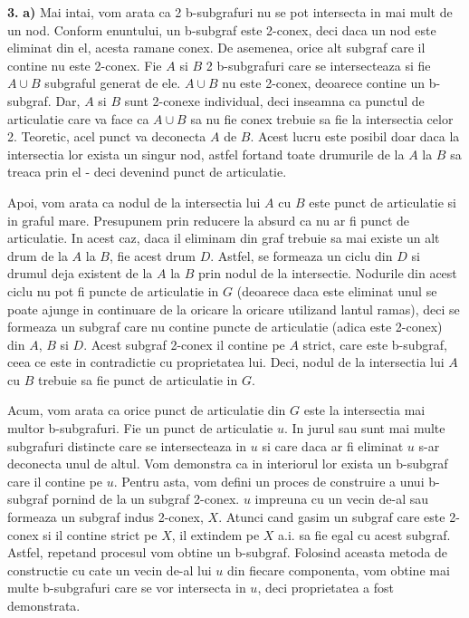 \documentclass{article}
\begin{document}
{\bf 3.} {\bf a)} Mai intai, vom arata ca 2 b-subgrafuri nu se pot intersecta in mai mult de un nod. Conform enuntului, un b-subgraf este 2-conex, deci daca un nod este eliminat din el, acesta ramane conex. De asemenea, orice alt subgraf care il contine nu este 2-conex. Fie $A$ si $B$ 2 b-subgrafuri care se intersecteaza si fie $A \cup B$ subgraful generat de ele. $A \cup B$ nu este 2-conex, deoarece contine un b-subgraf. Dar, $A$ si $B$ sunt 2-conexe individual, deci inseamna ca punctul de articulatie care va face ca $A \cup B$ sa nu fie conex trebuie sa fie la intersectia celor 2. Teoretic, acel punct va deconecta $A$ de $B$. Acest lucru este posibil doar daca la intersectia lor exista un singur nod, astfel fortand toate drumurile de la $A$ la $B$ sa treaca prin el - deci devenind punct de articulatie.

Apoi, vom arata ca nodul de la intersectia lui $A$ cu $B$ este punct de articulatie si in graful mare. Presupunem prin reducere la absurd ca nu ar fi punct de articulatie. In acest caz, daca il eliminam din graf trebuie sa mai existe un alt drum de la $A$ la $B$, fie acest drum $D$. Astfel, se formeaza un ciclu din $D$ si drumul deja existent de la $A$ la $B$ prin nodul de la intersectie. Nodurile din acest ciclu nu pot fi puncte de articulatie in $G$ (deoarece daca este eliminat unul se poate ajunge in continuare de la oricare la oricare utilizand lantul ramas), deci se formeaza un subgraf care nu contine puncte de articulatie (adica este 2-conex) din $A$, $B$ si $D$. Acest subgraf 2-conex il contine pe $A$ strict, care este b-subgraf, ceea ce este in contradictie cu proprietatea lui. Deci, nodul de la intersectia lui $A$ cu $B$ trebuie sa fie punct de articulatie in $G$.
 
Acum, vom arata ca orice punct de articulatie din $G$ este la intersectia mai multor b-subgrafuri. Fie un punct de articulatie $u$. In jurul sau sunt mai multe subgrafuri distincte care se intersecteaza in $u$ si care daca ar fi eliminat $u$ s-ar deconecta unul de altul. Vom demonstra ca in interiorul lor exista un b-subgraf care il contine pe $u$. Pentru asta, vom defini un proces de construire a unui b-subgraf pornind de la un subgraf 2-conex. $u$ impreuna cu un vecin de-al sau formeaza un subgraf indus 2-conex, $X$. Atunci cand gasim un subgraf care este 2-conex si il contine strict pe $X$, il extindem pe $X$ a.i. sa fie egal cu acest subgraf. Astfel, repetand procesul vom obtine un b-subgraf. Folosind aceasta metoda de constructie cu cate un vecin de-al lui $u$ din fiecare componenta, vom obtine mai multe b-subgrafuri care se vor intersecta in $u$, deci proprietatea a fost demonstrata.
\end{document}
